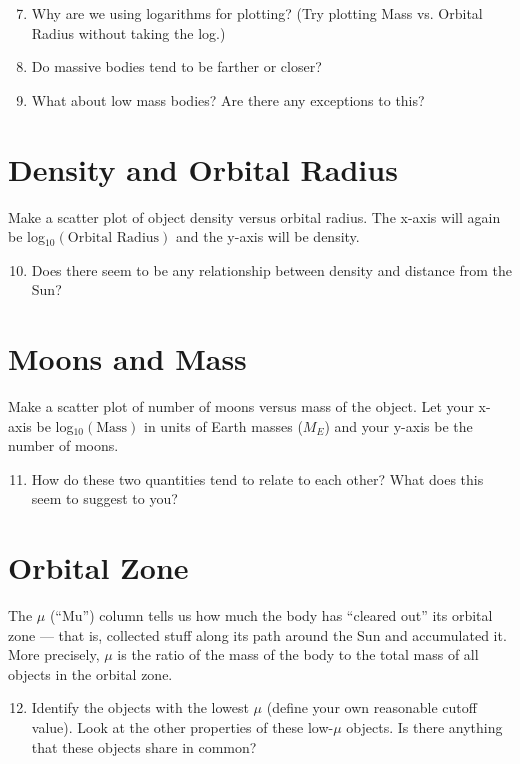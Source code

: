 \documentclass[12pt]{article}
\begin{document}
\begin{enumerate}
    \setcounter{enumi}{6}
    \item Why are we using logarithms for plotting? (Try plotting Mass vs. Orbital Radius without taking the log.)
    \item Do massive bodies tend to be farther or closer?
    \item What about low mass bodies? Are there any exceptions to this?
\end{enumerate}

   
\section*{Density and Orbital Radius}
Make a scatter plot of object density versus orbital radius. The x-axis will again be log$_{10}(\textrm{Orbital~Radius})$ and the y-axis will be density. 

\begin{enumerate}
    \setcounter{enumi}{9}
    \item Does there seem to be any relationship between density and distance from the Sun? 
\end{enumerate}


\section*{Moons and Mass}
Make a scatter plot of number of moons versus mass of the object. Let your x-axis be log$_{10}(\textrm{Mass})$ in units of Earth masses ($M_E$) and your y-axis be the number of moons.

\begin{enumerate}
\setcounter{enumi}{10}
    \item How do these two quantities tend to relate to each other? What does this seem to suggest to you?

\end{enumerate}

\section*{Orbital Zone}
The $\mu$ (``Mu'') column tells us how much the body has ``cleared out'' its orbital zone --- that is, collected stuff along its path around the Sun and accumulated it. More precisely, $\mu$ is the ratio of the mass of the body to
the total mass of all objects in the orbital zone.
\begin{enumerate}
\setcounter{enumi}{11}
    \item Identify the objects with the lowest $\mu$ (define your own reasonable cutoff value). Look at the other properties of these low-$\mu$ objects. Is there anything that these objects share in common?

\end{enumerate}
\end{document}
